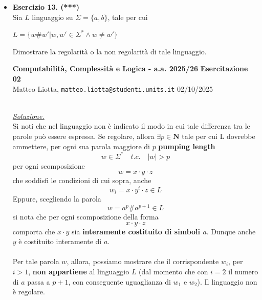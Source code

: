 \documentclass[a4paper,10pt]{article}
\newcommand{\EsercitazioneNum}{02}
\newcommand{\Data}{02/10/2025}
\begin{document}
{\begin{itemize}[label=, leftmargin=0pt]
\begin{osservazioni}
    \end{osservazioni}
    
    

    \item \textbf{Esercizio 13. (***)}\\ Sia $L$ linguaggio su $\Sigma=\{a,b\}$, tale per cui 
    {\begin{center}
        $L = \{ w\#w' | w,w'\in \Sigma^* \land w \neq w'\}$
    \end{center}} 
    Dimostrare la regolarità o la non regolarità di tale linguaggio.


    \vfill
    \noindent\makebox[\linewidth]{\rule{\linewidth}{0.4pt}}
    \newpage
    {\noindent
    \small \textbf{Computabilità, Complessità e Logica - a.a. 2025/26} \hfill \textbf{Esercitazione \EsercitazioneNum} \\[0.2cm]
    \scriptsize Matteo Liotta, \texttt{matteo.liotta@studenti.units.it} \hfill \Data \\[0.2cm]
    \noindent\makebox[\linewidth]{\rule{\linewidth}{0.4pt}} \\[0.3cm]}


    \begin{osservazioni}
        \underline{\textit{Soluzione.}}\\

        Si noti che nel linguaggio non è indicato il modo in cui tale differenza tra le parole può essere espressa. Se regolare, allora $\exists p\in \mathbf{N}$ tale per cui L dovrebbe ammettere, per ogni sua parola maggiore di $p$ \textbf{pumping length}$$w\in \Sigma^* \quad t.c.\quad |w|>p$$ per ogni scomposizione $$w=x\cdot y \cdot z$$ che soddisfi le condizioni di cui sopra, anche $$w_i=x\cdot y^i \cdot z \in L$$
        Eppure, scegliendo la parola $$w=a^{p}\#a^{p+1}\in L$$si nota che per ogni scomposizione della forma $$x\cdot y \cdot z$$ comporta che $x\cdot y$ sia \textbf{interamente costituito di simboli $a$}. Dunque anche $y$ è costituito interamente di $a$.\\\\
        Per tale parola $w$, allora, possiamo mostrare che il corrispondente $w_i$, per $i>1$, \textbf{non appartiene} al linguaggio $L$ (dal momento che con $i=2$ il numero di $a$ passa a $p+1$, con conseguente uguaglianza di $w_1$ e $w_2$). Il linguaggio non è regolare. 
        
    \end{osservazioni}


\end{itemize}}
\end{document}
